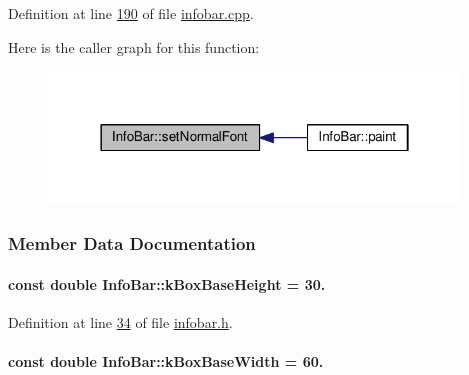 Definition at line \hyperlink{infobar_8cpp_source_l00190}{190} of file \hyperlink{infobar_8cpp_source}{infobar.\+cpp}.



Here is the caller graph for this function\+:\nopagebreak
\begin{figure}[H]
\begin{center}
\leavevmode
\includegraphics[width=310pt]{class_info_bar_a2bfda27ec3d1ae6b4b1c927876f594c1_icgraph}
\end{center}
\end{figure}




\subsubsection{Member Data Documentation}
\hypertarget{class_info_bar_a0f2f7b614000ae1d317ec3819acabbf2}{}
\paragraph[{k\+Box\+Base\+Height}]{\setlength{\rightskip}{0pt plus 5cm}const double Info\+Bar\+::k\+Box\+Base\+Height = 30.\hspace{0.3cm}{\ttfamily [static]}}\label{class_info_bar_a0f2f7b614000ae1d317ec3819acabbf2}


Definition at line \hyperlink{infobar_8h_source_l00034}{34} of file \hyperlink{infobar_8h_source}{infobar.\+h}.

\hypertarget{class_info_bar_a3eb5cc879199e1a927ed76eb989c4c0e}{}
\paragraph[{k\+Box\+Base\+Width}]{\setlength{\rightskip}{0pt plus 5cm}const double Info\+Bar\+::k\+Box\+Base\+Width = 60.\hspace{0.3cm}{\ttfamily [static]}}\label{class_info_bar_a3eb5cc879199e1a927ed76eb989c4c0e}


